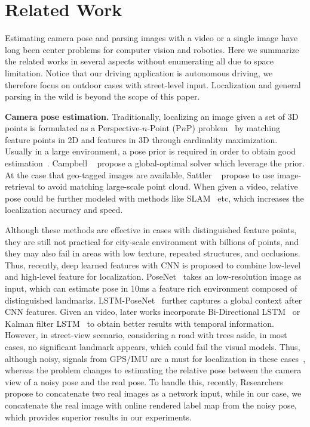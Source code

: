 \section{Related Work}
\label{sec:related_work}
Estimating camera pose and parsing images with a video or a single image have long been center problems for computer vision and robotics.
Here we summarize the related works in several aspects without enumerating all due to space limitation.
Notice that our driving application is autonomous driving,  we therefore focus on outdoor cases with street-level input. Localization and general parsing in the wild is beyond the scope of this paper.

\textbf{Camera pose estimation.} Traditionally, localizing an image given a set of 3D points is formulated as a Perspective-$n$-Point (P$n$P) problem~\cite{haralick1994review,kneip2014upnp} by matching feature points in 2D and features in 3D through cardinality maximization. Usually in a large environment, a pose prior is required in order to obtain good estimation~\cite{david2004softposit,moreno2008pose}. Campbell \etal~\cite{campbell2017globally} propose a global-optimal solver which leverage the prior. At the case that geo-tagged images are available, Sattler \etal~\cite{sattler2017large} propose to use image-retrieval to avoid matching large-scale point cloud.
When given a video, relative pose could be further modeled with methods like SLAM~\cite{engel2014lsd} etc, which increases the localization accuracy and speed.

Although these methods are effective in cases with distinguished feature points, they are still not practical for city-scale environment with billions of points, and they may also fail in areas with low texture, repeated structures, and occlusions.
Thus, recently, deep learned features with CNN is proposed to combine low-level and high-level feature for localization. PoseNet~\cite{Kendall_2015_ICCV,kendall2017geometric} takes an low-resolution image as input, which can estimate pose in 10ms \wrt a feature rich environment composed of distinguished landmarks. LSTM-PoseNet~\cite{hazirbasimage} further captures a global context after CNN features.
Given an video, later works incorporate Bi-Directional LSTM~\cite{DBLP:journals/corr/ClarkWMTW17} or Kalman filter LSTM~\cite{coskun2017long} to obtain better results with temporal information. However, in street-view scenario, considering a road with trees aside, in most cases, no significant landmark appears, which could fail the visual models. Thus, although noisy, signals from GPS/IMU are a must for localization in these cases~\cite{vishal2015accurate}, whereas the problem changes to estimating the relative pose between the camera view of a noisy pose and the real pose. To handle this, recently, Researchers ~\cite{laskar2017camera,ummenhofer2016demon} propose to concatenate two real images as a network input, while in our case, we concatenate the real image with online rendered label map from the noisy pose, which provides superior results in our experiments.

